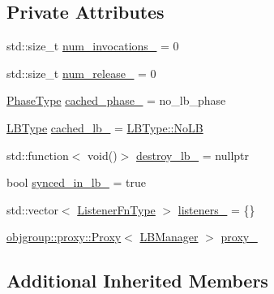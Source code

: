 \subsection*{Private Attributes}
\begin{DoxyCompactItemize}
\item 
std\+::size\+\_\+t \hyperlink{structvt_1_1vrt_1_1collection_1_1balance_1_1_l_b_manager_a216981a9e47bf75c8d734d66d98b516a}{num\+\_\+invocations\+\_\+} = 0
\item 
std\+::size\+\_\+t \hyperlink{structvt_1_1vrt_1_1collection_1_1balance_1_1_l_b_manager_a93855ddcd9842e951987256e81aa8802}{num\+\_\+release\+\_\+} = 0
\item 
\hyperlink{namespacevt_a46ce6733d5cdbd735d561b7b4029f6d7}{Phase\+Type} \hyperlink{structvt_1_1vrt_1_1collection_1_1balance_1_1_l_b_manager_aa15bf182a0d70f1fc756ac8893422777}{cached\+\_\+phase\+\_\+} = no\+\_\+lb\+\_\+phase
\item 
\hyperlink{namespacevt_1_1vrt_1_1collection_1_1balance_ac4f99693509affcc67db182d4aad9b5c}{L\+B\+Type} \hyperlink{structvt_1_1vrt_1_1collection_1_1balance_1_1_l_b_manager_aa21ee592ddcc09c269e546c0ebf47fd3}{cached\+\_\+lb\+\_\+} = \hyperlink{namespacevt_1_1vrt_1_1collection_1_1balance_ac4f99693509affcc67db182d4aad9b5cad12268b59a4f1098aee001f9a1750020}{L\+B\+Type\+::\+No\+LB}
\item 
std\+::function$<$ void()$>$ \hyperlink{structvt_1_1vrt_1_1collection_1_1balance_1_1_l_b_manager_a31af388e759240311470c17ec569155c}{destroy\+\_\+lb\+\_\+} = nullptr
\item 
bool \hyperlink{structvt_1_1vrt_1_1collection_1_1balance_1_1_l_b_manager_aa47677efcfd106dbd8ab387b1a8e0c21}{synced\+\_\+in\+\_\+lb\+\_\+} = true
\item 
std\+::vector$<$ \hyperlink{structvt_1_1vrt_1_1collection_1_1balance_1_1_l_b_manager_a1bb65b50c7cefb8c139a9f40a83ca18b}{Listener\+Fn\+Type} $>$ \hyperlink{structvt_1_1vrt_1_1collection_1_1balance_1_1_l_b_manager_a361d27be100f0ab1d7290c9d5565f845}{listeners\+\_\+} = \{\}
\item 
\hyperlink{structvt_1_1objgroup_1_1proxy_1_1_proxy}{objgroup\+::proxy\+::\+Proxy}$<$ \hyperlink{structvt_1_1vrt_1_1collection_1_1balance_1_1_l_b_manager}{L\+B\+Manager} $>$ \hyperlink{structvt_1_1vrt_1_1collection_1_1balance_1_1_l_b_manager_a4fef6bf68a7aee9980270ceeb5df0c2b}{proxy\+\_\+}
\end{DoxyCompactItemize}
\subsection*{Additional Inherited Members}



